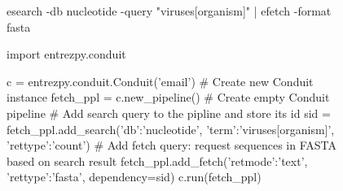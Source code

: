 \documentclass[preview, border=0]{standalone}
\begin{document}
  \begin{figure}




\begin{lrbox}{\mylistingbox}%
    \begin{minipage}{\linewidth}%
      \begin{bash}[xleftmargin=3mm, numbers=none]
esearch -db nucleotide -query "viruses[organism]"  | efetch -format fasta
\end{bash}%
    \end{minipage}%
  \end{lrbox}%

\begin{lrbox}{\mylistingbox}%
    \begin{minipage}{\linewidth}%
      \begin{python}[xleftmargin=3mm]
import entrezpy.conduit

c = entrezpy.conduit.Conduit('email') # Create new Conduit instance
fetch_ppl = c.new_pipeline()          # Create empty Conduit pipeline
# Add search query to the pipline and store its id
sid = fetch_ppl.add_search({'db':'nucleotide',
                            'term':'viruses[organism]',
                            'rettype':'count'})
# Add fetch query: request sequences in FASTA based on search result
fetch_ppl.add_fetch({'retmode':'text', 'rettype':'fasta'}, dependency=sid)
c.run(fetch_ppl)
\end{python}%
    \end{minipage}%
  \end{lrbox}%
  \end{figure}
\end{document}
